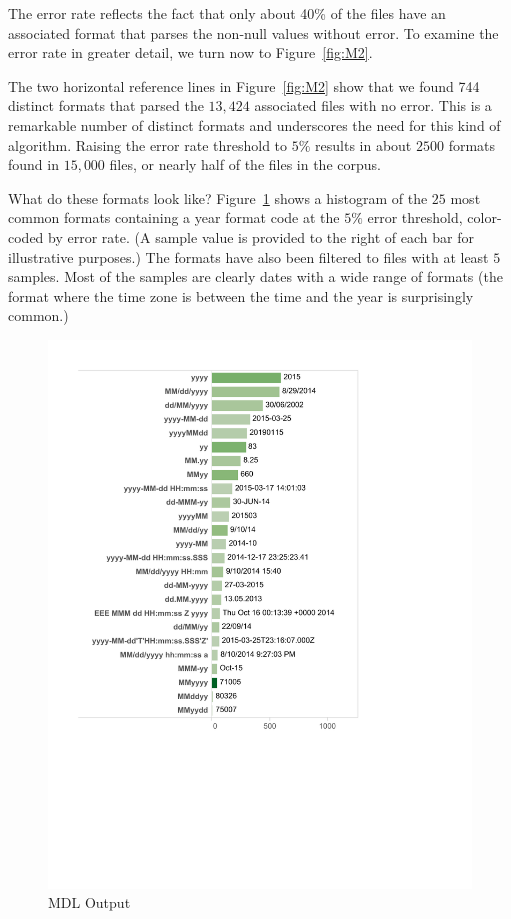 The error rate reflects the fact that only about 40\% of the files have an associated format that parses the non-null values without error. To examine the error rate in greater detail, we turn now to Figure~\ref{fig:M2}.

The two horizontal reference lines in Figure~\ref{fig:M2} show that we found 744 distinct formats that parsed the $13,424$ associated files with no error. 
This is a remarkable number of distinct formats and underscores the need for this kind of algorithm. 
Raising the error rate threshold to $5\%$ results in about $2500$ formats found in $15,000$ files, or nearly half of the files in the corpus. 

What do these formats look like? Figure~\ref{fig:M3} shows a histogram of the $25$ most common formats containing a year format code at the $5\%$ error threshold, color-coded by error rate. (A sample value is provided to the right of each bar for illustrative purposes.) The formats have also been filtered to files with at least $5$ samples. Most of the samples are clearly dates with a wide range of formats (the format where the time zone is between the time and the year is surprisingly common.)
 
\begin{figure}[ht]
\centering
\includegraphics[width=\columnwidth]{figures/FigureM3}
\caption{MDL Output}
\label{fig:M3}
\end{figure}

